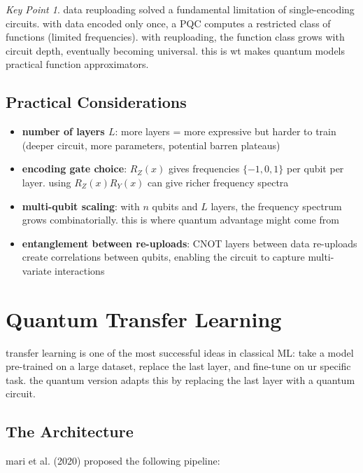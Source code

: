 \documentclass[11pt,a4paper]{article}
\theoremstyle{definition}
\theoremstyle{remark}
\newtheorem*{keypoint}{Key Point}
\begin{document}
\begin{keypoint}
data reuploading solved a fundamental limitation of single-encoding circuits. with data encoded only once, a PQC computes a restricted class of functions (limited frequencies). with reuploading, the function class grows with circuit depth, eventually becoming universal. this is wt makes quantum models practical function approximators.
\end{keypoint}

\subsection{Practical Considerations}

\begin{itemize}
    \item \textbf{number of layers $L$}: more layers = more expressive but harder to train (deeper circuit, more parameters, potential barren plateaus)
    \item \textbf{encoding gate choice}: $R_Z(x)$ gives frequencies $\{-1, 0, 1\}$ per qubit per layer. using $R_Z(x) R_Y(x)$ can give richer frequency spectra
    \item \textbf{multi-qubit scaling}: with $n$ qubits and $L$ layers, the frequency spectrum grows combinatorially. this is where quantum advantage might come from
    \item \textbf{entanglement between re-uploads}: CNOT layers between data re-uploads create correlations between qubits, enabling the circuit to capture multi-variate interactions
\end{itemize}

\section{Quantum Transfer Learning}

transfer learning is one of the most successful ideas in classical ML: take a model pre-trained on a large dataset, replace the last layer, and fine-tune on ur specific task. the quantum version adapts this by replacing the last layer with a quantum circuit.

\subsection{The Architecture}

mari et al. (2020) proposed the following pipeline:
\end{document}
